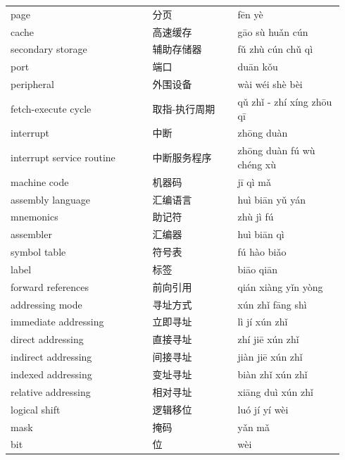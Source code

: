 \documentclass[11pt]{article}
\begin{document}
\begin{longtable}{@{}p{0.40\linewidth}p{0.24\linewidth}p{0.30\linewidth}@{}}
page & 分页 & fēn yè \\
cache & 高速缓存 & gāo sù huǎn cún \\
secondary storage & 辅助存储器 & fǔ zhù cún chǔ qì \\
port & 端口 & duān kǒu \\
peripheral & 外围设备 & wài wéi shè bèi \\
fetch-execute cycle & 取指-执行周期 & qǔ zhǐ - zhí xíng zhōu qī \\
interrupt & 中断 & zhōng duàn \\
interrupt service routine & 中断服务程序 & zhōng duàn fú wù chéng xù \\
machine code & 机器码 & jī qì mǎ \\
assembly language & 汇编语言 & huì biān yǔ yán \\
mnemonics & 助记符 & zhù jì fú \\
assembler & 汇编器 & huì biān qì \\
symbol table & 符号表 & fú hào biǎo \\
label & 标签 & biāo qiān \\
forward references & 前向引用 & qián xiàng yǐn yòng \\
addressing mode & 寻址方式 & xún zhǐ fāng shì \\
immediate addressing & 立即寻址 & lì jí xún zhǐ \\
direct addressing & 直接寻址 & zhí jiē xún zhǐ \\
indirect addressing & 间接寻址 & jiàn jiē xún zhǐ \\
indexed addressing & 变址寻址 & biàn zhǐ xún zhǐ \\
relative addressing & 相对寻址 & xiāng duì xún zhǐ \\
logical shift & 逻辑移位 & luó jí yí wèi \\
mask & 掩码 & yǎn mǎ \\
bit & 位 & wèi \\
\end{longtable}
\end{document}
